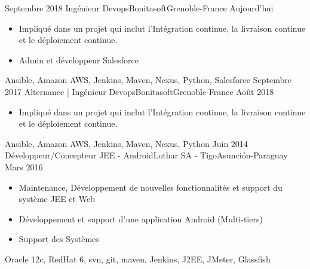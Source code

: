 %
%
%
\begin{experiences}
  \experience
    {Septembre 2018}   {Ingénieur Devops}{Bonitasoft}{Grenoble-France}
    {Aujourd'hui} {
                      \begin{itemize}
                        \item Impliqué dans un projet qui inclut l'Intégration continue, la livraison continue et le déploiement continue.
                        \item Admin et développeur Salesforce
                      \end{itemize}
                    }
                    {Ansible, Amazon AWS, Jenkins, Maven, Nexus, Python, Salesforce}
  \emptySeparator
  \experience
    {Septembre 2017}   {Alternance | Ingénieur Devops}{Bonitasoft}{Grenoble-France}
    {Août 2018} {
                      \begin{itemize}
                        \item Impliqué dans un projet qui inclut l'Intégration continue, la livraison continue et le déploiement continue.
                      \end{itemize}
                    }
                    {Ansible, Amazon AWS, Jenkins, Maven, Nexus, Python}
  \emptySeparator
  \experience
    {Juin 2014}   {Développeur/Concepteur JEE - Android}{Lothar SA - Tigo}{Asunción-Paraguay}
    {Mars 2016} {
                      \begin{itemize}
                        \item Maintenance, Développement de nouvelles fonctionnalités et support du système JEE et Web
                        \item Développement et support d'une application Android (Multi-tiers)
                        \item Support des Systèmes
                      \end{itemize}

				}{Oracle 12c, RedHat 6, svn, git, maven, Jenkins, J2EE, JMeter, Glassfish}
  \emptySeparator


\end{experiences}
